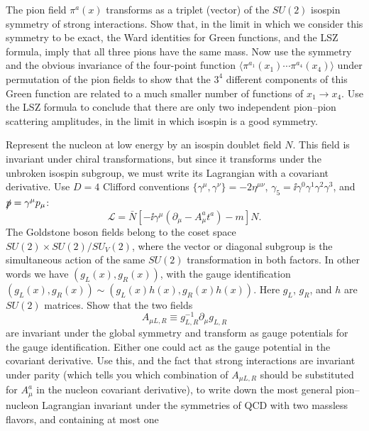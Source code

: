 \begin{banksproblems}
The pion field $\pi^a(x)$ transforms as a triplet (vector) of the $SU(2)$
isospin symmetry of strong interactions. Show that, in the limit in which we
consider this symmetry to be exact, the Ward identities for Green functions,
and the LSZ formula, imply that all three pions have the same mass. Now use
the symmetry and the obvious invariance of the four-point function
$\langle\pi^{a_1}(x_1)\cdots\pi^{a_4}(x_4)\rangle$ under permutation of the pion
fields to show that the $3^4$ different components of this Green function are
related to a much smaller number of functions of $x_1\to x_4$. Use the LSZ
formula to conclude that there are only two independent pion--pion scattering
amplitudes, in the limit in which isospin is a good symmetry.

Represent the nucleon at low energy by an isospin doublet field $N$. This field
is invariant under chiral transformations, but since it transforms under the
unbroken isospin subgroup, we must write its Lagrangian with a covariant
derivative. Use $D=4$ Clifford conventions
$\{\gamma^\mu,\gamma^\nu\}=-2\eta^{\mu\nu}$,
$\gamma_5=\ii\gamma^0\gamma^1\gamma^2\gamma^3$, and
$\slashed p=\gamma^\mu p_\mu$:
\begin{equation*}
  \mathcal L=\bar N[-\ii\gamma^\mu(\partial_\mu-A_\mu^a t^a)-m]N.
\end{equation*}
The Goldstone boson fields belong to the coset space
$SU(2)\times SU(2)/SU_V(2)$, where the vector or diagonal subgroup is the
simultaneous action of the same $SU(2)$ transformation in both factors. In
other words we have $(g_L(x),g_R(x))$, with the gauge identification
$(g_L(x),g_R(x))\sim(g_L(x)h(x),g_R(x)h(x))$. Here $g_L$, $g_R$, and $h$ are
$SU(2)$ matrices. Show that the two fields
\begin{equation*}
  A_{\mu L,R}\equiv g_{L,R}^{-1}\partial_\mu g_{L,R}
\end{equation*}
are invariant under the global symmetry and transform as gauge potentials for
the gauge identification. Either one could act as the gauge potential in the
covariant derivative. Use this, and the fact that strong interactions are
invariant under parity (which tells you which combination of $A_{\mu L,R}$
should be substituted for $A_\mu^a$ in the nucleon covariant derivative), to
write down the most general pion--nucleon Lagrangian invariant under the
symmetries of QCD with two massless flavors, and containing at most one

\end{banksproblems}
